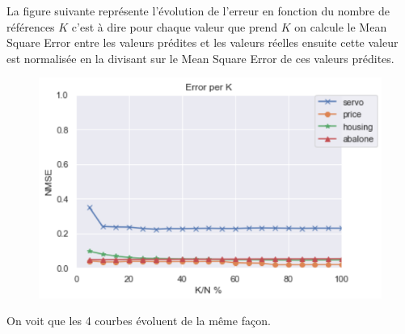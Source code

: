 \documentclass[12pt,a4paper]{report}
\begin{document}
\par La figure suivante représente l'évolution de l'erreur en fonction du nombre de références $K$ c'est à dire pour chaque valeur que prend $K$ on calcule le Mean Square Error entre les valeurs prédites et les valeurs réelles ensuite cette valeur est normalisée en la divisant sur le Mean Square Error de ces valeurs prédites.
\begin{figure}[!h]
	\vspace{-0.5cm}
    \centering
\includegraphics[height=0.4\textwidth]{regr.png}

\end{figure}
\par On voit que les 4 courbes évoluent de la même façon. 
\end{document}
